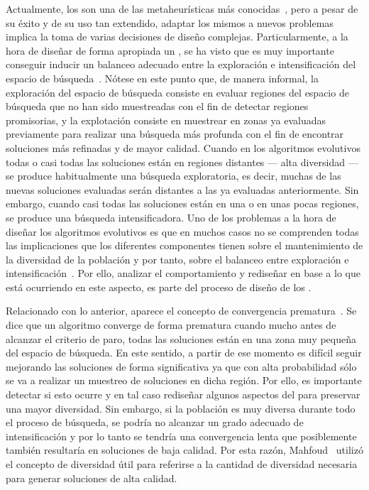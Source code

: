 Actualmente, los \EAS{} son una de las metaheurísticas más conocidas~\cite{glover2005handbook}, pero a pesar de su éxito y de su uso tan extendido, adaptar los mismos
a nuevos problemas implica la toma de varias decisiones de diseño complejas.
%
Particularmente, a la hora de diseñar de forma apropiada un \EA{}, se ha visto que es muy importante conseguir
inducir un balanceo adecuado entre la exploración e intensificación del espacio de búsqueda~\cite{herrera1996adaptation}.
%
Nótese en este punto que, de manera informal, la exploración del espacio de búsqueda consiste en evaluar regiones del espacio de búsqueda que no han sido muestreadas
con el fin de detectar regiones promisorias, y la explotación consiste en muestrear en zonas ya evaluadas previamente para realizar una búsqueda más profunda 
con el fin de encontrar soluciones más refinadas y de mayor calidad.
%
Cuando en los algoritmos evolutivos todas o casi todas las soluciones están en regiones distantes --- alta diversidad --- se produce habitualmente una búsqueda exploratoria, 
es decir, muchas de las nuevas soluciones evaluadas serán distantes a las ya evaluadas anteriormente.
%
Sin embargo, cuando casi todas las soluciones están en una o en unas pocas regiones, se produce una búsqueda intensificadora.
%
Uno de los problemas a la hora de diseñar los algoritmos evolutivos es que en muchos casos no se comprenden todas las implicaciones que los diferentes componentes
tienen sobre el mantenimiento de la diversidad de la población y por tanto, sobre el balanceo entre exploración e intensificación~\cite{Crepinsek:13}.
%
Por ello, analizar el comportamiento y rediseñar en base a lo que está ocurriendo en este aspecto, es parte del proceso de diseño de los \EAS{}.

Relacionado con lo anterior, aparece el concepto de convergencia prematura~\cite{Crepinsek:13}.
%
Se dice que un algoritmo converge de forma prematura cuando mucho antes de alcanzar el criterio de paro, todas las soluciones están en una zona muy pequeña del espacio de búsqueda.
%
En este sentido, a partir de ese momento es difícil seguir mejorando las soluciones de forma significativa ya que con alta probabilidad sólo se va a realizar un muestreo de soluciones en dicha
región.
%
Por ello, es importante detectar si esto ocurre y en tal caso rediseñar algunos aspectos del \EA{}
para preservar una mayor diversidad.
%
Sin embargo, si la población es muy diversa durante todo el proceso de búsqueda, se podría no alcanzar un grado adecuado de intensificación y por lo tanto 
se tendría una convergencia lenta que posiblemente también resultaría en soluciones de baja calidad.
%
Por esta razón, Mahfoud~\cite{dasgupta2013evolutionary} utilizó el concepto de diversidad útil para referirse a la cantidad de diversidad necesaria para generar 
soluciones de alta calidad.


